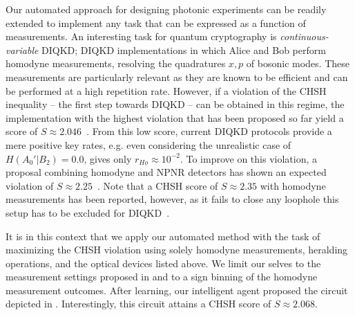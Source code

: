 Our automated approach for designing photonic experiments can be readily extended to implement any task that can be expressed as a function of measurements.
An interesting task for quantum cryptography is \textit{continuous-variable} DIQKD; DIQKD implementations in which Alice and Bob perform homodyne measurements, resolving the quadratures $x,p$ of bosonic modes.
These measurements are particularly relevant as they are known to be efficient and can be performed at a high repetition rate.
However, if a violation of the CHSH inequality -- the first step towards DIQKD -- can be obtained in this regime, the implementation with the highest violation that has been proposed so far yield a score of $S \approx 2.046$~\cite{GarciaPatron2004,GarciaPatron2005}.
From this low score, current DIQKD protocols provide a mere positive key rates, e.g. even considering the unrealistic case of $H(A_0'|B_2)=0.0$,  gives only $r_{Ho}\approx 10^{-2}$.
To improve on this violation, a proposal combining homodyne and NPNR detectors has shown an expected violation of $S\approx 2.25$~\cite{Cavalcanti2011}.
Note that a CHSH score of $S \approx 2.35$ with homodyne measurements has been reported, however, as it fails to close any loophole this setup has to be excluded for DIQKD~\cite{Thearle2018}.

It is in this context that we apply our automated method with the task of maximizing the CHSH violation using solely homodyne measurements, heralding operations, and the optical devices listed above.
We limit our selves to the measurement settings proposed in \cite{GarciaPatron2005} and to a sign binning of the homodyne measurement outcomes.
After learning, our intelligent agent proposed the circuit depicted in . 
Interestingly, this circuit attains a CHSH score of $S\approx 2.068$. 

